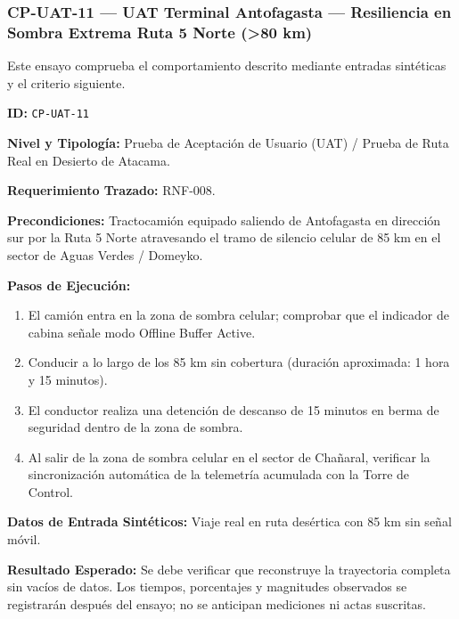 \subsubsection*{CP-UAT-11 — UAT Terminal Antofagasta — Resiliencia en Sombra Extrema Ruta 5 Norte (>80 km)}\label{sec:9-cp-uat-11}
Este ensayo comprueba el comportamiento descrito mediante entradas sintéticas y el criterio siguiente.

\par\noindent\textbf{ID:} \texttt{C\allowbreak{}P\allowbreak{}-\allowbreak{}U\allowbreak{}A\allowbreak{}T\allowbreak{}-\allowbreak{}1\allowbreak{}1\allowbreak{}}\par
\par\noindent\textbf{Nivel y Tipología:} Prueba de Aceptación de Usuario (UAT) / Prueba de Ruta Real en Desierto de Atacama.\par
\par\noindent\textbf{Requerimiento Trazado:} RNF-008.\par
\par\noindent\textbf{Precondiciones:} Tractocamión equipado saliendo de Antofagasta en dirección sur por la Ruta 5 Norte atravesando el tramo de silencio celular de 85 km en el sector de Aguas Verdes / Domeyko.\par
\par\noindent\textbf{Pasos de Ejecución:} \par
\begin{enumerate}
\item El camión entra en la zona de sombra celular; comprobar que el indicador de cabina señale modo Offline Buffer Active.
\item Conducir a lo largo de los 85 km sin cobertura (duración aproximada: 1 hora y 15 minutos).
\item El conductor realiza una detención de descanso de 15 minutos en berma de seguridad dentro de la zona de sombra.
\item Al salir de la zona de sombra celular en el sector de Chañaral, verificar la sincronización automática de la telemetría acumulada con la Torre de Control.
\end{enumerate}
\par\noindent\textbf{Datos de Entrada Sintéticos:} Viaje real en ruta desértica con 85 km sin señal móvil.\par
\par\noindent\textbf{Resultado Esperado:} Se debe verificar que reconstruye la trayectoria completa sin vacíos de datos. Los tiempos, porcentajes y magnitudes observados se registrarán después del ensayo; no se anticipan mediciones ni actas suscritas.\par
